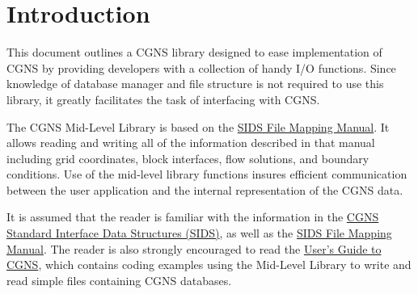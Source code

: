 \section{Introduction}
\label{s:intro}
\thispagestyle{plain}

This document outlines a CGNS library designed to ease implementation of
CGNS by providing developers with a collection of handy I/O functions.
Since knowledge of database manager and file structure is not required to use
this library, it greatly facilitates the task of interfacing with CGNS.

The CGNS Mid-Level Library is based on the
\href{../filemap/filemap.pdf}{SIDS File Mapping Manual}.
It allows reading and writing all of the information described in
that manual including grid coordinates, block interfaces, flow
solutions, and boundary conditions.
Use of the mid-level library functions insures efficient
communication between the user application and the internal
representation of the CGNS data.

It is assumed that the reader is familiar with the information in the
\href{../sids/sids.pdf}{CGNS Standard Interface Data Structures
(SIDS)}, as well as the
\href{../filemap/filemap.pdf}{SIDS File Mapping Manual}.
The reader is also strongly encouraged to read the
\href{../user/user.pdf}{User's Guide to CGNS}, which contains
coding examples using the Mid-Level Library to write and read simple
files containing CGNS databases.
